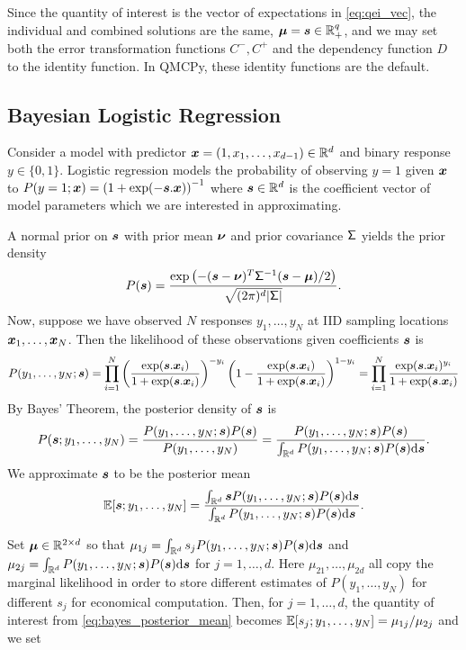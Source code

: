 \documentclass{article}[12pt]
\begin{document}
Since the quantity of interest is the vector of expectations in \eqref{eq:qei_vec}, the individual and combined solutions are the same, $\boldsymbol{\mu} = \boldsymbol{s} \in \mathbb{R}_+^q$, and we may set both the error transformation functions $C^-,C^+$ and the dependency function $D$ to the identity function. In QMCPy, these identity functions are the default. 

\subsection{Bayesian Logistic Regression}

Consider a model with predictor $\boldsymbol{x} = (1,x_1, \dots, x_{d-1}) \in \mathbb{R}^d$ and binary response $y \in \{0,1\}$. Logistic regression models the probability of observing $y = 1$ given $\boldsymbol{x}$ to $P(y=1;\boldsymbol{x}) = \left(1+\exp(-\boldsymbol{s}.\boldsymbol{x})\right)^{-1}$ where $\boldsymbol{s} \in \mathbb{R}^d$ is the coefficient vector of model parameters which we are interested in approximating.

A normal prior on $\boldsymbol{s}$ with prior mean $\boldsymbol{\nu}$ and prior covariance $\mathsf{\Sigma}$ yields the prior density
$$P(\boldsymbol{s}) = \frac{\exp\left(-(\boldsymbol{s}-\boldsymbol{\nu})^T\mathsf{\Sigma}^{-1}(\boldsymbol{s}-\boldsymbol{\mu})/2\right)}{\sqrt{(2\pi)^d\lvert \mathsf{\Sigma}\rvert}}.$$ Now, suppose we have observed $N$ responses $y_1,\dots,y_N$ at IID sampling locations $\boldsymbol{x}_1,\dots,\boldsymbol{x}_N$. Then the likelihood of these observations given coefficients $\boldsymbol{s}$ is
\begin{equation*}
    P(y_1,\dots,y_N ; \boldsymbol{s}) = \prod_{i=1}^N \left(\frac{\exp(\boldsymbol{s}.\boldsymbol{x}_i)}{1+\exp(\boldsymbol{s}.\boldsymbol{x}_i)}\right)^{-y_i} \left(1-\frac{\exp(\boldsymbol{s}.\boldsymbol{x}_i)}{1+\exp(\boldsymbol{s}.\boldsymbol{x}_i)}\right)^{1-y_i} = \prod_{i=1}^N \frac{\exp(\boldsymbol{s}.\boldsymbol{x}_i)^{y_i}}{1+\exp(\boldsymbol{s}.\boldsymbol{x}_i)}
\end{equation*}
By Bayes' Theorem, the posterior density of $\boldsymbol{s}$ is 
$$P(\boldsymbol{s};y_1,\dots,y_N) = \frac{P(y_1,\dots,y_N;\boldsymbol{s})P(\boldsymbol{s})}{P(y_1,\dots,y_N)} = \frac{P(y_1,\dots,y_N;\boldsymbol{s})P(\boldsymbol{s})}{\int_{\mathbb{R}^d} P(y_1,\dots,y_N;\boldsymbol{s})P(\boldsymbol{s})\mathrm{d}\boldsymbol{s}}.$$
We approximate $\boldsymbol{s}$ to be the posterior mean
\begin{equation}
    \mathbb{E}[\boldsymbol{s};y_1,\dots,y_N] = \frac{\int_{\mathbb{R}^d}\boldsymbol{s} P(y_1,\dots,y_N;\boldsymbol{s})P(\boldsymbol{s})\mathrm{d}\boldsymbol{s}}{\int_{\mathbb{R}^d}P(y_1,\dots,y_N;\boldsymbol{s})P(\boldsymbol{s})\mathrm{d}\boldsymbol{s}}. \label{eq:bayes_posterior_mean}
\end{equation}

Set $\boldsymbol{\mu} \in \mathbb{R}^{2 \times d}$ so that $\mu_{1j} = \int_{\mathbb{R}^d}s_j P(y_1,\dots,y_N;\boldsymbol{s})P(\boldsymbol{s})\mathrm{d}\boldsymbol{s}$ and $\mu_{2j} = \int_{\mathbb{R}^d}P(y_1,\dots,y_N;\boldsymbol{s})P(\boldsymbol{s})\mathrm{d}\boldsymbol{s}$ for $j=1,\dots,d$. Here $\mu_{21},\dots,\mu_{2d}$ all copy the marginal likelihood in order to store different estimates of $P(y_1,\dots,y_N)$ for different $s_j$ for economical computation.  Then, for $j=1,\dots,d$,  the quantity of interest from \eqref{eq:bayes_posterior_mean} becomes $\mathbb{E}[s_j;y_1,\dots,y_N] = \mu_{1j}/\mu_{2j}$ and we set
\end{document}
